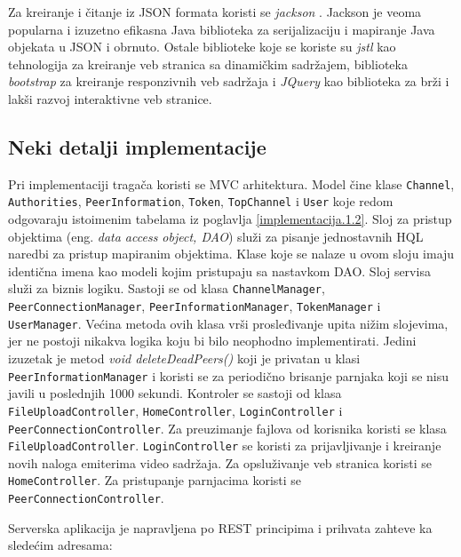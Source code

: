 \documentclass[12pt,oneside]{memoir}
\begin{document}
Za kreiranje i čitanje iz JSON formata koristi se \textit{jackson} \cite{Jackson}. Jackson je veoma popularna i izuzetno efikasna Java biblioteka za serijalizaciju i mapiranje Java objekata u JSON i obrnuto. Ostale biblioteke koje se koriste su \textit{jstl} \cite{JSTL} kao tehnologija za kreiranje veb stranica sa dinamičkim sadržajem, biblioteka \textit{bootstrap} \cite{Bootstrap} za kreiranje responzivnih veb sadržaja i \textit{JQuery} \cite{JQuery} kao biblioteka za brži i lakši razvoj interaktivne veb stranice. 


\subsection{Neki detalji implementacije}
\label{implementacija.1.3}

Pri implementaciji tragača koristi se MVC arhitektura. Model čine klase \texttt{Channel}, \texttt{Authorities}, \texttt{PeerInformation}, \texttt{Token}, \texttt{TopChannel} i \texttt{User} koje redom odgovaraju istoimenim tabelama iz poglavlja \ref{implementacija.1.2}. Sloj za pristup objektima (eng. \textit{data access object, DAO}) služi za pisanje jednostavnih HQL naredbi za pristup mapiranim objektima. Klase koje se nalaze u ovom sloju imaju identična imena kao modeli kojim pristupaju sa nastavkom DAO. Sloj servisa služi za biznis logiku. Sastoji se od klasa \texttt{ChannelManager}, \texttt{PeerConnectionManager}, \texttt{PeerInformationManager}, \texttt{TokenManager} i \texttt{UserManager}. Većina metoda ovih klasa vrši prosleđivanje upita nižim slojevima, jer ne postoji nikakva logika koju bi bilo neophodno implementirati. Jedini izuzetak je metod \textit{void deleteDeadPeers()} koji je privatan u klasi \texttt{PeerInformationManager} i koristi se za periodično brisanje parnjaka koji se nisu javili u poslednjih 1000 sekundi. Kontroler se sastoji od klasa \texttt{FileUploadController}, \texttt{HomeController}, \texttt{LoginController} i \texttt{PeerConnectionController}. Za preuzimanje fajlova od korisnika koristi se klasa \texttt{FileUploadController}. \texttt{LoginController} se koristi za prijavljivanje i kreiranje novih naloga emiterima video sadržaja.
Za opsluživanje veb stranica koristi se \texttt{HomeController}. Za pristupanje parnjacima koristi se \texttt{PeerConnectionController}.

Serverska aplikacija je napravljena po REST principima i prihvata zahteve ka
sledećim adresama:
\end{document}
